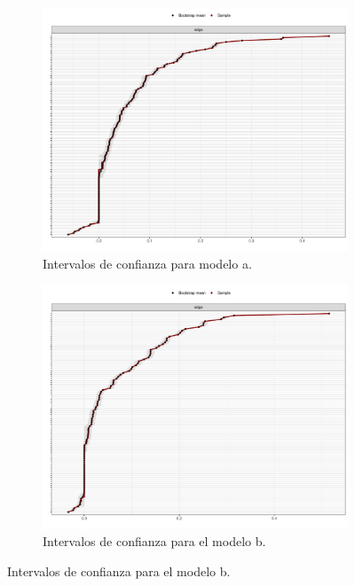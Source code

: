 \documentclass[11pt,spanish]{article}\usepackage[]{graphicx}\usepackage[]{color}
\begin{document}
\begin{figure}[ht]
\centering
\begin{subfigure}{0.49\textwidth}
    \includegraphics[width=\textwidth]{images/interval_pcl15.pdf}
    \caption{Intervalos de confianza para modelo a. }
    \label{fig:interval_pcl5}
\end{subfigure}
\begin{subfigure}{0.49\textwidth}
    \includegraphics[width=\textwidth]{images/interval_dean.pdf}
  \caption{Intervalos de confianza para el modelo b. }
  \label{fig:interval_dean}
\end{subfigure}

\end{figure}
\end{document}
